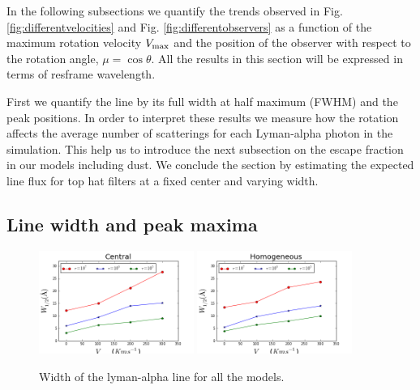 \documentclass[usenatbib]{mn2e}
\begin{document}
In the following subsections we quantify the trends observed in
Fig. \ref{fig:differentvelocities} and
Fig. \ref{fig:differentobservers} as a function of the maximum
rotation velocity $V_{\rm max}$ and the position of the observer with
respect to the rotation angle, $\mu = \cos{\theta}$. All the results
in this section will be expressed in terms of resframe wavelength.

First we quantify the line by its full width at half maximum
(FWHM) and the peak positions. In order to interpret these results we
measure how the rotation affects the average number of scatterings
for each Lyman-alpha photon in the simulation. This help us to
introduce the next subsection on the escape fraction in our models
including dust. We conclude the section by estimating the
expected line flux for top hat filters at a fixed center and varying
width. 

\subsection{Line width and peak maxima}
\label{sec:widthpeak}


\begin{figure}
    \includegraphics[width=0.45\textwidth]{WidthCentral.png}
    \includegraphics[width=0.45\textwidth]{WidthHomogeneous.png}
   \caption{Width of the lyman-alpha line for all the models.   \label{fig:widthvsvelocity}}
\end{figure}
\end{document}
